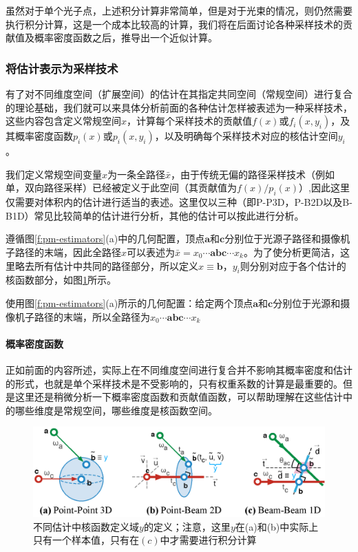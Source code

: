 虽然对于单个光子点，上述积分计算非常简单，但是对于光束的情况，则仍然需要执行积分计算，这是一个成本比较高的计算，我们将在后面讨论各种采样技术的贡献值及概率密度函数之后，推导出一个近似计算。





\subsubsection{将估计表示为采样技术}
有了对不同维度空间（扩展空间）的估计在其指定共同空间（常规空间）进行复合的理论基础，我们就可以来具体分析前面的各种估计怎样被表述为一种采样技术，这些内容包含定义常规空间$x$，计算每个采样技术的贡献值$f(x)$或$f_i(x,y_i)$，及其概率密度函数$p_i(x)$或$p_i(x,y_i)$，以及明确每个采样技术对应的核估计空间$y_i$。

我们定义常规空间变量$x$为一条全路径$\bar{x}$，由于传统无偏的路径采样技术（例如单，双向路径采样）已经被定义于此空间（其贡献值为$f(x)/p_i(x)$）,因此这里仅需要对体积内的估计进行适当的表述。这里仅以三种（即P-P3D，P-B2D以及B-B1D）常见比较简单的估计进行分析，其他的估计可以按此进行分析。


遵循图\ref{f:pm-estimators}(a)中的几何配置，顶点$\mathbf{a}$和$\mathbf{c}$分别位于光源子路径和摄像机子路径的末端，因此全路径$x$可以表述为$\bar{x}=x_0\cdots\mathbf{a}\mathbf{b}\mathbf{c}\cdots x_k$。为了使分析更简洁，这里略去所有估计中共同的路径部分，所以定义$x\equiv \mathbf{b}$，$y_i$则分别对应于各个估计的核函数部分，如图\ref{f:pm-y}所示。

使用图\ref{f:pm-estimators}(a)所示的几何配置：给定两个顶点$\mathbf{a}$和$\mathbf{c}$分别位于光源和摄像机子路径的末端，所以全路径为$x_0\cdots\mathbf{a}\mathbf{b}\mathbf{c}\cdots x_k$




\paragraph{概率密度函数}
正如前面的内容所述，实际上在不同维度空间进行复合并不影响其概率密度和估计的形式，也就是单个采样技术是不受影响的，只有权重系数的计算是最重要的。但是这里还是稍微分析一下概率密度函数和贡献值函数，可以帮助理解在这些估计中的哪些维度是常规空间，哪些维度是核函数空间。

\begin{figure}
	\includegraphics[width=1.\textwidth]{figures/pm/y}
	\caption{不同估计中核函数定义域$y$的定义；注意，这里$y$在(a)和(b)中实际上只有一个样本值，只有在$(c)$中才需要进行积分计算}
	\label{f:pm-y}
\end{figure}

